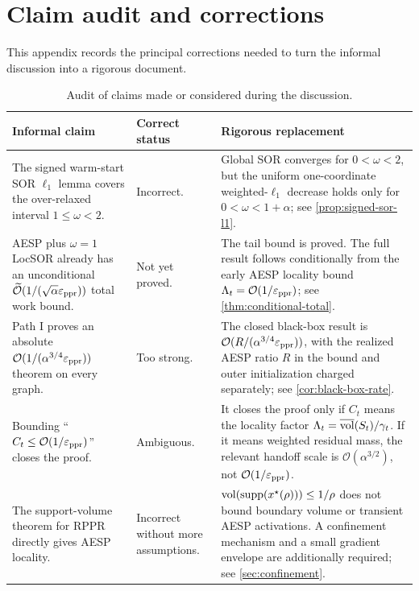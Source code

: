 \section{Claim audit and corrections}
\label{app:claim-audit}

This appendix records the principal corrections needed to turn the informal
discussion into a rigorous document.

\begin{table}[h]
\centering
\caption{Audit of claims made or considered during the discussion.}
\label{tab:claim-audit}
\begin{tabularx}{\textwidth}{@{}p{}p{}X@{}}
\toprule
Informal claim & Correct status & Rigorous replacement \\
\midrule
The signed warm-start SOR \(\ell_1\) lemma covers the over-relaxed interval
\(1\leq\omega<2\).
& Incorrect.
& Global SOR converges for \(0<\omega<2\), but the uniform one-coordinate
weighted-\(\ell_1\) decrease holds only for \(0<\omega<1+\alpha\); see
\cref{prop:signed-sor-l1}. \\

AESP plus \(\omega=1\) LocSOR already has an unconditional
\(\widetilde{\mathcal O}(1/(\sqrt\alpha\varepsilon_{\mathrm{ppr}}))\) total work bound.
& Not yet proved.
& The tail bound is proved.  The full result follows conditionally from the
early AESP locality bound \(\Lambda_t=\mathcal O(1/\varepsilon_{\mathrm{ppr}})\); see
\cref{thm:conditional-total}. \\

Path I proves an absolute
\(\mathcal O(1/(\alpha^{3/4}\varepsilon_{\mathrm{ppr}}))\) theorem on every graph.
& Too strong.
& The closed black-box result is
\(\mathcal O(R/(\alpha^{3/4}\varepsilon_{\mathrm{ppr}}))\), with the realized AESP ratio \(R\) in
the bound and outer initialization charged separately; see
\cref{cor:black-box-rate}. \\

Bounding ``\(C_t\leq\mathcal O(1/\varepsilon_{\mathrm{ppr}})\)'' closes the proof.
& Ambiguous.
& It closes the proof only if \(C_t\) means the locality factor
\(\Lambda_t=\overline{\operatorname{vol}}(S_t)/\gamma_t\).  If it means weighted residual
mass, the relevant handoff scale is \(\mathcal O(\alpha^{3/2})\), not
\(\mathcal O(1/\varepsilon_{\mathrm{ppr}})\). \\

The support-volume theorem for RPPR directly gives AESP locality.
& Incorrect without more assumptions.
& \(\operatorname{vol}(\operatorname{supp}(x^\star(\rho)))\leq1/\rho\) does not bound boundary volume or
transient AESP activations.  A confinement mechanism and a small gradient
envelope are additionally required; see \cref{sec:confinement}. \\


\end{tabularx}
\end{table}
